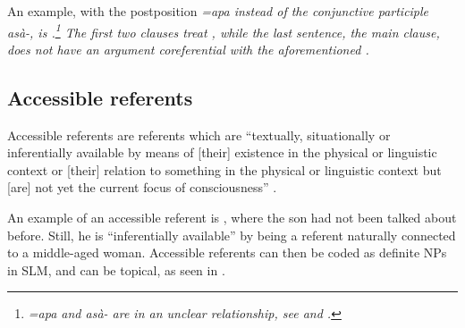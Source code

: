An example, with the postposition \em =apa \em instead of the conjunctive participle \em asà-, \em is .\footnote{\em =apa \em and \em asà- \em are in an unclear relationship, see  and  .} The first two clauses treat , while the last sentence, the main clause, does not have an argument coreferential with the aforementioned .





\subsection{Accessible referents}\label{sec:disc:Accessiblereferents}
Accessible referents are referents which are ``textually, situationally or inferentially available by means of [their] existence in the physical or linguistic context or [their] relation to something in the physical or linguistic context but [are] not yet the current focus of consciousness'' \citep[200]{VanValinEtAl1997rrg}.

An example of an accessible referent is  , where the son   had not been talked about before. Still, he is ``inferentially available'' by being a referent naturally connected to a middle-aged woman. Accessible referents can then be coded as definite NPs in SLM, and can be topical, as seen in .






